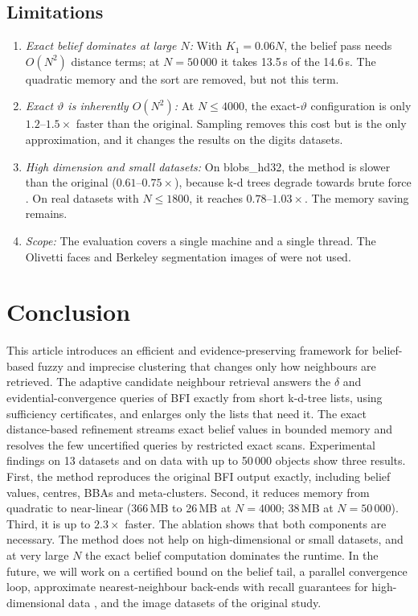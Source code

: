 \documentclass[journal]{IEEEtran}
\begin{document}
\subsection{Limitations}
\begin{enumerate}
\item \emph{Exact belief dominates at large $N$:} With $K_1=0.06N$, the belief pass needs $O(N^2)$ distance terms; at $N=50\,000$ it takes 13.5\,s of the 14.6\,s. The quadratic memory and the sort are removed, but not this term.
\item \emph{Exact $\vartheta$ is inherently $O(N^2)$:} At $N\le4000$, the exact-$\vartheta$ configuration is only $1.2$--$1.5\times$ faster than the original. Sampling removes this cost but is the only approximation, and it changes the results on the digits datasets.
\item \emph{High dimension and small datasets:} On blobs\_hd32, the method is slower than the original ($0.61$--$0.75\times$), because k-d trees degrade towards brute force \cite{weber1998}. On real datasets with $N\le1800$, it reaches $0.78$--$1.03\times$. The memory saving remains.
\item \emph{Scope:} The evaluation covers a single machine and a single thread. The Olivetti faces and Berkeley segmentation images of \cite{zhang2025} were not used.
\end{enumerate}

\section{Conclusion}\label{sec:concl}
This article introduces an efficient and evidence-preserving framework for belief-based fuzzy and imprecise clustering that changes only how neighbours are retrieved. The adaptive candidate neighbour retrieval answers the $\delta$ and evidential-convergence queries of BFI exactly from short k-d-tree lists, using sufficiency certificates, and enlarges only the lists that need it. The exact distance-based refinement streams exact belief values in bounded memory and resolves the few uncertified queries by restricted exact scans. Experimental findings on 13 datasets and on data with up to 50\,000 objects show three results. First, the method reproduces the original BFI output exactly, including belief values, centres, BBAs and meta-clusters. Second, it reduces memory from quadratic to near-linear (366\,MB to 26\,MB at $N=4000$; 38\,MB at $N=50\,000$). Third, it is up to $2.3\times$ faster. The ablation shows that both components are necessary. The method does not help on high-dimensional or small datasets, and at very large $N$ the exact belief computation dominates the runtime. In the future, we will work on a certified bound on the belief tail, a parallel convergence loop, approximate nearest-neighbour back-ends with recall guarantees for high-dimensional data \cite{malkov2020}, and the image datasets of the original study.



\end{document}
